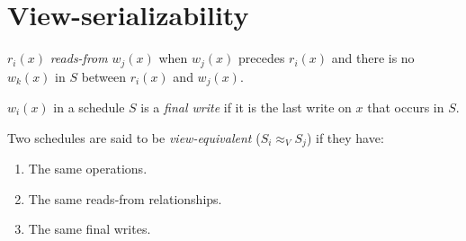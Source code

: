 \section{View-serializability}

\begin{definition}
    $r_i(x)$ \emph{reads-from} $w_j(x)$ when  $w_j(x)$  precedes  $r_i(x)$ and there is no  $w_k(x)$ in $S$ between  $r_i(x)$  and  $w_j(x)$. 
    
    $w_i(x)$ in a schedule $S$ is a \emph{final write} if it is the last write on $x$ that occurs in $S$. 

    Two schedules are said to be \emph{view-equivalent} ($S_i \approx_V S_j$) if they have:
    \begin{enumerate}
        \item The same operations. 
        \item The same reads-from relationships.
        \item The same final writes. 
    \end{enumerate}
\end{definition}

